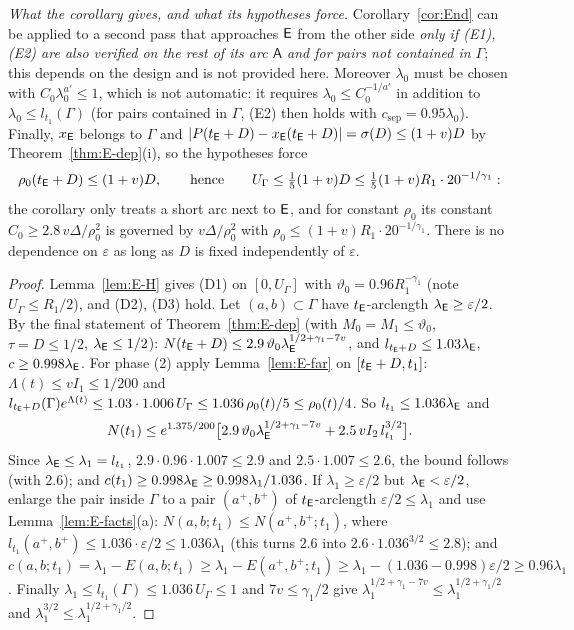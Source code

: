 \emph{What the corollary gives, and what its hypotheses force.} Corollary~\ref{cor:End} can be applied to a second pass that
approaches $\mathsf E$ from the other side \emph{only if \textup{(E1)}, \textup{(E2)} are also verified on the rest of its arc
$\mathsf A$ and for pairs not contained in $\Gamma$}; this depends on the design and is not provided here. Moreover $\lambda_0$
must be chosen with $C_0\lambda_0^{a'}\le1$, which is not automatic: it requires $\lambda_0\le C_0^{-1/a'}$ in addition to
$\lambda_0\le l_{t_1}(\Gamma)$ (for pairs contained in $\Gamma$, (E2) then holds with $c_{\mathrm{sep}}=0.95\lambda_0$). Finally,
$x_{\mathsf E}$ belongs to $\Gamma$ and $|P(t_{\mathsf E}+D)-x_{\mathsf E}(t_{\mathsf E}+D)|=\sigma(D)\le(1+v)D$ by Theorem~\ref{thm:E-dep}(i), so the hypotheses
force
\[
\rho_0(t_{\mathsf E}+D)\le(1+v)D,\qquad\text{hence}\qquad U_\Gamma\le\tfrac15(1+v)D\le\tfrac15(1+v)R_1\cdot20^{-1/\gamma_1}:
\]
the corollary only treats a short arc next to $\mathsf E$, and for constant $\rho_0$ its constant $C_0\ge2.8\,v\Delta/\rho_0^2$ is governed
by $v\Delta/\rho_0^2$ with $\rho_0\le(1+v)R_1\cdot20^{-1/\gamma_1}$. There is no dependence on $\varepsilon$ as long as $D$ is fixed
independently of $\varepsilon$.
\begin{proof}
Lemma~\ref{lem:E-H} gives (D1) on $[0,U_\Gamma]$ with $\vartheta_0=0.96R_1^{-\gamma_1}$ (note $U_\Gamma\le R_1/2$), and (D2), (D3)
hold. Let $(a,b)\subset\Gamma$ have $t_{\mathsf E}$-arclength $\lambda_{\mathsf E}\ge\varepsilon/2$. By the final statement of
Theorem~\ref{thm:E-dep} (with $M_0=M_1\le\vartheta_0$, $\tau=D\le1/2$, $\lambda_{\mathsf E}\le1/2$):
$N(t_{\mathsf E}+D)\le2.9\,\vartheta_0\lambda_{\mathsf E}^{1/2+\gamma_1-7v}$, and $l_{t_{\mathsf E}+D}\le1.03\lambda_{\mathsf E}$, $c\ge0.998\lambda_{\mathsf E}$. For
phase (2) apply Lemma~\ref{lem:E-far} on $[t_{\mathsf E}+D,t_1]$: $\Lambda(t)\le vI_1\le1/200$ and
$l_{t_{\mathsf E}+D}(\Gamma)e^{\Lambda(t)}\le1.03\cdot1.006\,U_\Gamma\le1.036\,\rho_0(t)/5\le\rho_0(t)/4$. So
$l_{t_1}\le1.036\lambda_{\mathsf E}$ and
\[
N(t_1)\le e^{1.375/200}\bigl[2.9\,\vartheta_0\lambda_{\mathsf E}^{1/2+\gamma_1-7v}+2.5\,vI_2\,l_{t_1}^{3/2}\bigr].
\]
Since $\lambda_{\mathsf E}\le\lambda_1=l_{t_1}$, $2.9\cdot0.96\cdot1.007\le2.9$ and $2.5\cdot1.007\le2.6$, the bound follows (with
$2.6$); and $c(t_1)\ge0.998\lambda_{\mathsf E}\ge0.998\lambda_1/1.036$. If $\lambda_1\ge\varepsilon/2$ but
$\lambda_{\mathsf E}<\varepsilon/2$, enlarge the pair inside $\Gamma$ to a pair $(a^+,b^+)$ of $t_{\mathsf E}$-arclength
$\varepsilon/2\le\lambda_1$ and use Lemma~\ref{lem:E-facts}(a): $N(a,b;t_1)\le N(a^+,b^+;t_1)$, where
$l_{t_1}(a^+,b^+)\le1.036\cdot\varepsilon/2\le1.036\lambda_1$ (this turns $2.6$ into $2.6\cdot1.036^{3/2}\le2.8$); and
$c(a,b;t_1)=\lambda_1-E(a,b;t_1)\ge\lambda_1-E(a^+,b^+;t_1)\ge\lambda_1-(1.036-0.998)\varepsilon/2\ge0.96\lambda_1$. Finally
$\lambda_1\le l_{t_1}(\Gamma)\le1.036\,U_\Gamma\le1$ and $7v\le\gamma_1/2$ give
$\lambda_1^{1/2+\gamma_1-7v}\le\lambda_1^{1/2+\gamma_1/2}$ and $\lambda_1^{3/2}\le\lambda_1^{1/2+\gamma_1/2}$.
\end{proof}

